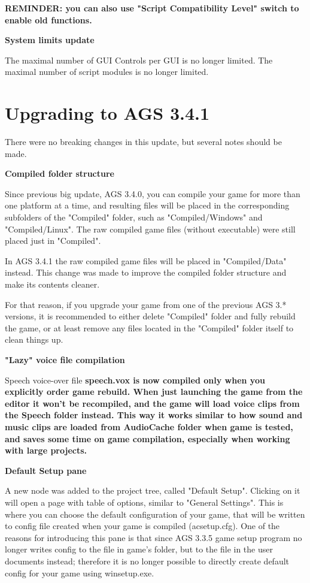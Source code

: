 \bf{REMINDER:} you can also use "Script Compatibility Level" switch to enable old functions.

\bf{System limits update}

The maximal number of GUI Controls per GUI is no longer limited.
The maximal number of script modules is no longer limited.


\chapter{Upgrading to AGS 3.4.1}\label{UpgradeTo341}%

There were no breaking changes in this update, but several notes should be made.

\bf{Compiled folder structure}

Since previous big update, AGS 3.4.0, you can compile your game for more than one platform at a time, and resulting files will be placed in the corresponding subfolders of the "Compiled" folder, such as "Compiled/Windows" and "Compiled/Linux". The raw compiled game files (without executable) were still placed just in "Compiled".

In AGS 3.4.1 the raw compiled game files will be placed in "Compiled/Data" instead. This change was made to improve the compiled folder structure and make its contents cleaner.

For that reason, if you upgrade your game from one of the previous AGS 3.* versions, it is recommended to either delete "Compiled" folder and fully rebuild the game, or at least remove any files located in the "Compiled" folder itself to clean things up.

\bf{"Lazy" voice file compilation}

Speech voice-over file \bf{speech.vox} is now compiled only when you explicitly order game rebuild. When just launching the game from the editor it won't be recompiled, and the game will load voice clips from the Speech folder instead. This way it works similar to how sound and music clips are loaded from AudioCache folder when game is tested, and saves some time on game compilation, especially when working with large projects.

\bf{Default Setup pane}

A new node was added to the project tree, called "Default Setup". Clicking on it will open a page with table of options, similar to "General Settings". This is where you can choose the default configuration of your game, that will be written to config file created when your game is compiled (acsetup.cfg).
One of the reasons for introducing this pane is that since AGS 3.3.5 game setup program no longer writes config to the file in game's folder, but to the file in the user documents instead; therefore it is no longer possible to directly create default config for your game using winsetup.exe.

